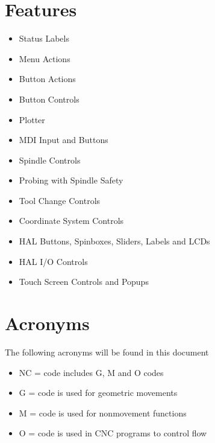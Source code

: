 \documentclass[letterpaper,10pt,english]{sphinxmanual}
\begin{document}
\section{Features}
\label{\detokenize{description:features}}\begin{itemize}
\item {} 
\sphinxAtStartPar
Status Labels

\item {} 
\sphinxAtStartPar
Menu Actions

\item {} 
\sphinxAtStartPar
Button Actions

\item {} 
\sphinxAtStartPar
Button Controls

\item {} 
\sphinxAtStartPar
Plotter

\item {} 
\sphinxAtStartPar
MDI Input and Buttons

\item {} 
\sphinxAtStartPar
Spindle Controls

\item {} 
\sphinxAtStartPar
Probing with Spindle Safety

\item {} 
\sphinxAtStartPar
Tool Change Controls

\item {} 
\sphinxAtStartPar
Coordinate System Controls

\item {} 
\sphinxAtStartPar
HAL Buttons, Spinboxes, Sliders, Labels and LCDs

\item {} 
\sphinxAtStartPar
HAL I/O Controls

\item {} 
\sphinxAtStartPar
Touch Screen Controls and Popups

\end{itemize}


\section{Acronyms}
\label{\detokenize{description:acronyms}}
\sphinxAtStartPar
The following acronyms will be found in this document
\begin{itemize}
\item {} 
\sphinxAtStartPar
NC =  code includes G, M and O codes

\item {} 
\sphinxAtStartPar
G =  code is used for geometric movements

\item {} 
\sphinxAtStartPar
M =  code is used for non\sphinxhyphen{}movement functions

\item {} 
\sphinxAtStartPar
O =  code is used in CNC programs to control flow

\end{itemize}
\end{document}
